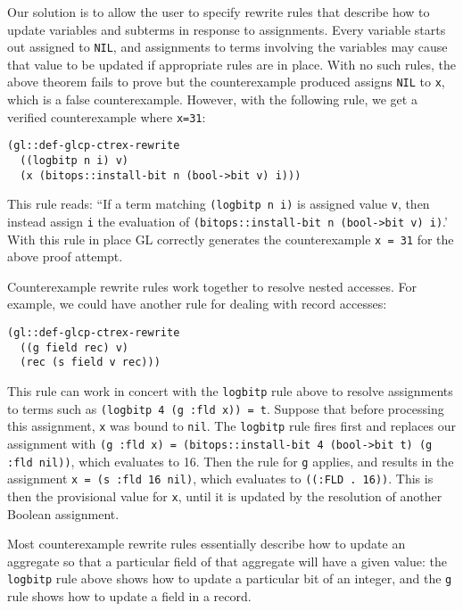 \documentclass[submission,copyright,creativecommons]{eptcs}
\begin{document}
Our solution is to allow the user to specify rewrite rules that
describe how to update variables and subterms in response to
assignments.  Every variable starts out assigned to \texttt{NIL}, and
assignments to terms involving the variables may cause that value to
be updated if appropriate rules are in place.  With no such rules, the
above theorem fails to prove but the counterexample produced assigns
\texttt{NIL} to \texttt{x}, which is a false counterexample.  However,
with the following rule, we get a verified counterexample where
\texttt{x=31}:
\begin{verbatim}
(gl::def-glcp-ctrex-rewrite
  ((logbitp n i) v)
  (x (bitops::install-bit n (bool->bit v) i)))
\end{verbatim}
This rule reads: ``If a term matching \texttt{(logbitp n i)} is
assigned value \texttt{v}, then instead assign \texttt{i} the
evaluation of \texttt{(bitops::install-bit n (bool->bit v) i)}.'  With
this rule in place GL correctly generates the counterexample \texttt{x
  = 31} for the above proof attempt.

Counterexample rewrite rules work together to resolve nested accesses.
For example, we could have another rule for dealing with record accesses:
\begin{verbatim}
(gl::def-glcp-ctrex-rewrite
  ((g field rec) v)
  (rec (s field v rec)))
\end{verbatim}
\noindent This rule can work in concert with the \texttt{logbitp} rule
above to resolve assignments to terms such as \texttt{(logbitp 4 (g
  :fld x)) = t}.  Suppose that before processing this assignment, \texttt{x} was bound to \texttt{nil}.
The \texttt{logbitp} rule fires
first and replaces our assignment with \texttt{(g :fld x) =
  (bitops::install-bit 4 (bool->bit t) (g :fld nil))}, which evaluates
to 16.  Then the rule for \texttt{g} applies, and results in the
assignment \texttt{x = (s :fld 16 nil)}, which evaluates to
\texttt{((:FLD . 16))}.  This is then the provisional value for
\texttt{x}, until it is updated by the resolution of another Boolean assignment.

Most counterexample rewrite rules essentially describe how to update
an aggregate so that a particular field of that aggregate will have a
given value: the \texttt{logbitp} rule above shows how to update a
particular bit of an integer, and the \texttt{g} rule shows how to
update a field in a record.  
\end{document}
